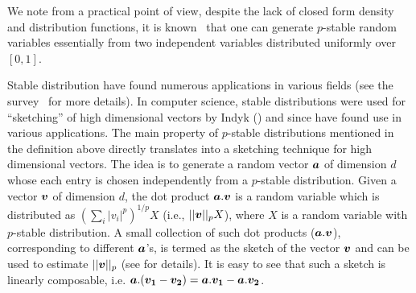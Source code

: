 \documentclass[12pt]{article}
\newcommand{\bm}[1]{\mbox{\boldmath$#1$}}
\begin{document}

We note from a practical point of view, despite the lack of closed form
density and distribution functions, it is known~\cite{CMS} that one can
generate $p$-stable random variables essentially from two independent
variables distributed uniformly over $[0,1]$.

Stable distribution have
found numerous applications in various fields (see the survey~\cite{Nol}
for more details). In computer science, stable distributions were used for
``sketching'' of high dimensional vectors by Indyk (\cite{I00b}) and since
have found use in various applications.
The main property of $p$-stable distributions mentioned in the definition
above directly translates into a
sketching technique for high dimensional vectors. The idea is to
generate a random vector $\bm{a}$ of dimension $d$ whose each entry is
chosen independently from a $p$-stable distribution. Given a vector
$\bm{v}$ of dimension $d$, the dot product $\bm{a}.\bm{v}$ is a random variable
which is distributed as $(\sum_i |v_i|^p)^{1/p} X$ (i.e., $||\bm{v}||_p
X$), where $X$ is a random variable with $p$-stable distribution. A small
collection of such dot products ($\bm{a}.\bm{v}$), corresponding to different
$\bm{a}$'s, is termed as the sketch of the vector $\bm{v}$ and can be used to
estimate $||\bm{v}||_p$ (see
\cite{I00b} for details). It is easy to see that such a sketch is linearly
composable, i.e. $\bm{a}.(\bm{v_1} -\bm{v_2}) = \bm{a}.\bm{v_1} - \bm{a}.\bm{v_2}$.
\end{document}
